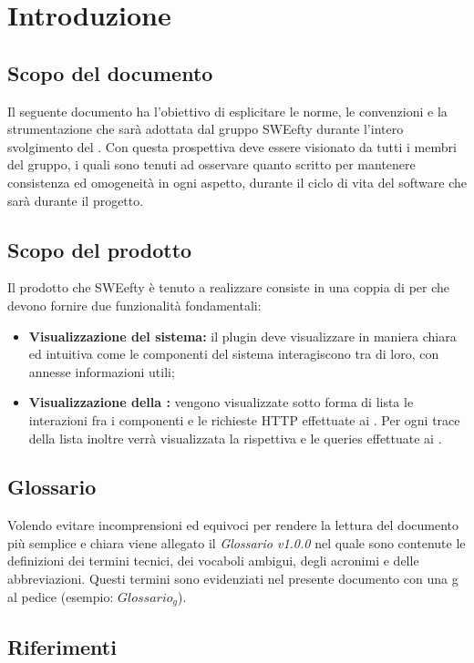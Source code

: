 \section{Introduzione}
\subsection{Scopo del documento}
Il seguente documento ha l'obiettivo di esplicitare le norme, le convenzioni e la strumentazione che sarà adottata dal gruppo SWEefty durante l'intero svolgimento del . Con questa prospettiva deve essere visionato da tutti i membri del gruppo, i quali sono tenuti ad osservare quanto scritto per mantenere consistenza ed omogeneità in ogni aspetto, durante il ciclo di vita del software che sarà  durante il progetto.
\subsection{Scopo del prodotto}
	Il prodotto che SWEefty è tenuto a realizzare consiste in una coppia di  per  che devono fornire due funzionalità fondamentali:
	\begin{itemize}
		\item \textbf{Visualizzazione  del sistema:} il plugin deve visualizzare in maniera chiara ed intuitiva come le componenti del sistema interagiscono tra di loro, con annesse informazioni utili;
		\item \textbf{Visualizzazione della :} vengono visualizzate sotto forma di lista le interazioni fra i componenti e le richieste HTTP effettuate ai . Per ogni trace della lista inoltre verrà visualizzata la rispettiva  e le queries effettuate ai .
	\end{itemize}

\subsection{Glossario}
	Volendo evitare incomprensioni  ed equivoci per rendere la lettura del documento più semplice e chiara viene allegato il \emph{Glossario v1.0.0} nel quale sono contenute le definizioni dei termini tecnici, dei vocaboli ambigui, degli acronimi e delle abbreviazioni. Questi termini sono evidenziati nel presente documento con una g al pedice (esempio: $Glossario_{g}$).

\subsection{Riferimenti}
